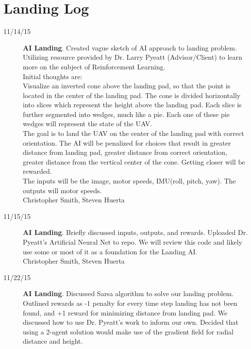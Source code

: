 \section{Landing Log}

\begin{description}
\item [11/14/15] \textbf{AI Landing}. Created vague sketch of AI approach to landing problem. Utilizing resource provided by Dr. Larry Pyeatt (Advisor/Client) to learn more on the subject of Reinforcement Learning. \\
Initial thoughts are:\\
Visualize an inverted cone above the landing pad, so that the point is located in the center of the landing pad. The cone is divided horizontally into slices which represent the height above the landing pad. Each slice is further segmented into wedges, much like a pie. Each one of these pie wedges will represent the state of the UAV. \\
The goal is to land the UAV on the center of the landing pad with correct orientation. The AI will be penalized for choices that result in greater distance from landing pad, greater distance from correct orientation, greater distance from the vertical center of the cone. Getting closer will be rewarded.\\
The inputs will be the image, motor speeds, IMU(roll, pitch, yaw). The outputs will motor speeds.\\

\hfill{Christopher Smith, Steven Huerta}

\item [11/15/15] \textbf{AI Landing}. Briefly discussed inputs, outputs, and rewards. Uploaded Dr. Pyeatt's Artificial Neural Net to repo. We will review this code and likely use some or most of it as a foundation for the Landing AI.\\

\hfill{Christopher Smith, Steven Huerta}\

\item [11/22/15] \textbf{AI Landing}. Discussed Sarsa algorithm to solve our landing problem. Outlined rewards as -1 penalty for every time step landing has not been found, and +1 reward for minimizing distance from landing pad. We discussed how to use Dr. Pyeatt's work to inform our own. Decided that using a 2-agent solution would make use of the gradient field for radial distance and height.\\


\end{description}
